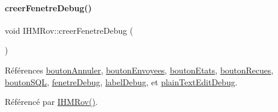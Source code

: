 \paragraph{\texorpdfstring{creer\+Fenetre\+Debug()}{creerFenetreDebug()}}
{\footnotesize\ttfamily void I\+H\+M\+Rov\+::creer\+Fenetre\+Debug (\begin{DoxyParamCaption}{ }\end{DoxyParamCaption})\hspace{0.3cm}{\ttfamily [private]}}



Références \hyperlink{class_i_h_m_rov_a4a6fec1b4a86c93c1d0d62d66804db5c}{bouton\+Annuler}, \hyperlink{class_i_h_m_rov_a7a441ed53b0066edaf1f0acbea24e777}{bouton\+Envoyees}, \hyperlink{class_i_h_m_rov_a82f0ceba3dadd7a3d3251c236bf212a4}{bouton\+Etats}, \hyperlink{class_i_h_m_rov_ae56bf1c744f0fc393ef517e0e66b0d12}{bouton\+Recues}, \hyperlink{class_i_h_m_rov_a5dca475dd63a04c96386855a84c5effb}{bouton\+S\+QL}, \hyperlink{class_i_h_m_rov_a393d23f9256a9db063dfef11d95cdc06}{fenetre\+Debug}, \hyperlink{class_i_h_m_rov_a667455d332d2abf2e42b897e6cc632f8}{label\+Debug}, et \hyperlink{class_i_h_m_rov_ae2a7bec24a52ffd9e53baf1185ab6cd7}{plain\+Text\+Edit\+Debug}.



Référencé par \hyperlink{class_i_h_m_rov_a5dac1fb4612866cc61f699a415e0ef6b}{I\+H\+M\+Rov()}.


